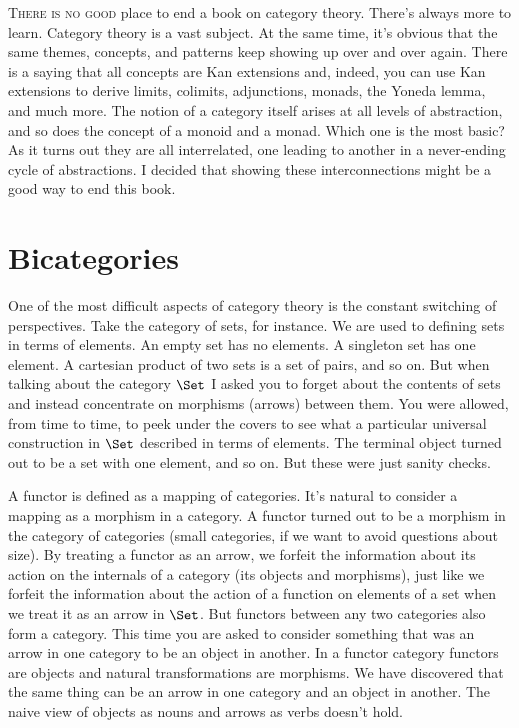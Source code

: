 \lettrine[lhang=0.17]{T}{here is no good} place to end a book on category theory. There's always
more to learn. Category theory is a vast subject. At the same time, it's
obvious that the same themes, concepts, and patterns keep showing up
over and over again. There is a saying that all concepts are Kan
extensions and, indeed, you can use Kan extensions to derive limits,
colimits, adjunctions, monads, the Yoneda lemma, and much more. The
notion of a category itself arises at all levels of abstraction, and so
does the concept of a monoid and a monad. Which one is the most basic?
As it turns out they are all interrelated, one leading to another in a
never-ending cycle of abstractions. I decided that showing these
interconnections might be a good way to end this book.

\section{Bicategories}\label{bicategories}

One of the most difficult aspects of category theory is the constant
switching of perspectives. Take the category of sets, for instance. We
are used to defining sets in terms of elements. An empty set has no
elements. A singleton set has one element. A cartesian product of two
sets is a set of pairs, and so on. But when talking about the category
$\Set$ I asked you to forget about the contents of sets and
instead concentrate on morphisms (arrows) between them. You were
allowed, from time to time, to peek under the covers to see what a
particular universal construction in $\Set$ described in terms of
elements. The terminal object turned out to be a set with one element,
and so on. But these were just sanity checks.

A functor is defined as a mapping of categories. It's natural to
consider a mapping as a morphism in a category. A functor turned out to
be a morphism in the category of categories (small categories, if we
want to avoid questions about size). By treating a functor as an arrow,
we forfeit the information about its action on the internals of a
category (its objects and morphisms), just like we forfeit the
information about the action of a function on elements of a set when we
treat it as an arrow in $\Set$. But functors between any two
categories also form a category. This time you are asked to consider
something that was an arrow in one category to be an object in another.
In a functor category functors are objects and natural transformations
are morphisms. We have discovered that the same thing can be an arrow in
one category and an object in another. The naive view of objects as
nouns and arrows as verbs doesn't hold.

